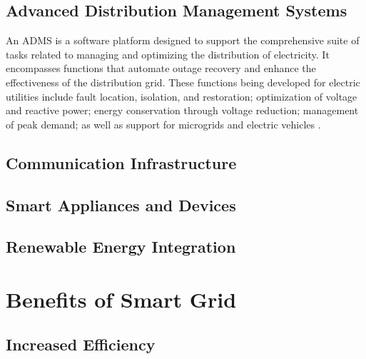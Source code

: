 \subsection{Advanced Distribution Management Systems }
An ADMS is a software platform designed to support the comprehensive suite of tasks related to managing and optimizing the distribution of electricity. It encompasses functions that automate outage recovery and enhance the effectiveness of the distribution grid. These functions being developed for electric utilities include fault location, isolation, and restoration; optimization of voltage and reactive power; energy conservation through voltage reduction; management of peak demand; as well as support for microgrids and electric vehicles \cite{avazov2016advanced}.






\subsection{Communication Infrastructure}
\subsection{Smart Appliances and Devices}
\subsection{Renewable Energy Integration}

\section{Benefits of Smart Grid}  
\subsection{Increased Efficiency}
